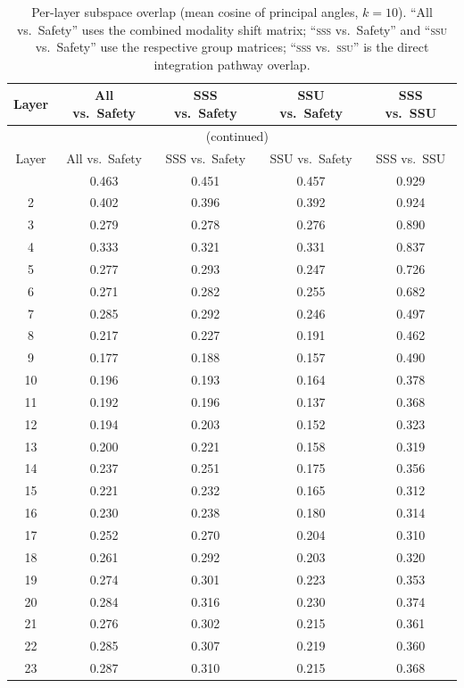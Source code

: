 \documentclass{article}
\newcommand{\ssu}{\textsc{ssu}}
\newcommand{\sss}{\textsc{sss}}
\begin{document}
\begin{longtable}{c cccc}
\caption{Per-layer subspace overlap (mean cosine of principal angles, $k{=}10$).
         ``All vs.\ Safety'' uses the combined modality shift matrix; ``\sss{}
         vs.\ Safety'' and ``\ssu{} vs.\ Safety'' use the respective group
         matrices; ``\sss{} vs.\ \ssu{}'' is the direct integration pathway
         overlap.}
\label{tab:overlap_full}\\
\toprule
Layer & All vs.\ Safety & SSS vs.\ Safety & SSU vs.\ Safety & SSS vs.\ SSU \\
\midrule
\endfirsthead
\multicolumn{5}{c}{\tablename\ \thetable{} (continued)} \\
\toprule
Layer & All vs.\ Safety & SSS vs.\ Safety & SSU vs.\ Safety & SSS vs.\ SSU \\
\midrule
\endhead
\bottomrule
\endlastfoot
 1 & 0.463 & 0.451 & 0.457 & 0.929 \\
 2 & 0.402 & 0.396 & 0.392 & 0.924 \\
 3 & 0.279 & 0.278 & 0.276 & 0.890 \\
 4 & 0.333 & 0.321 & 0.331 & 0.837 \\
 5 & 0.277 & 0.293 & 0.247 & 0.726 \\
 6 & 0.271 & 0.282 & 0.255 & 0.682 \\
 7 & 0.285 & 0.292 & 0.246 & 0.497 \\
 8 & 0.217 & 0.227 & 0.191 & 0.462 \\
 9 & 0.177 & 0.188 & 0.157 & 0.490 \\
10 & 0.196 & 0.193 & 0.164 & 0.378 \\
11 & 0.192 & 0.196 & 0.137 & 0.368 \\
12 & 0.194 & 0.203 & 0.152 & 0.323 \\
13 & 0.200 & 0.221 & 0.158 & 0.319 \\
14 & 0.237 & 0.251 & 0.175 & 0.356 \\
15 & 0.221 & 0.232 & 0.165 & 0.312 \\
16 & 0.230 & 0.238 & 0.180 & 0.314 \\
17 & 0.252 & 0.270 & 0.204 & 0.310 \\
18 & 0.261 & 0.292 & 0.203 & 0.320 \\
19 & 0.274 & 0.301 & 0.223 & 0.353 \\
20 & 0.284 & 0.316 & 0.230 & 0.374 \\
21 & 0.276 & 0.302 & 0.215 & 0.361 \\
22 & 0.285 & 0.307 & 0.219 & 0.360 \\
23 & 0.287 & 0.310 & 0.215 & 0.368 \\

\end{longtable}
\end{document}
